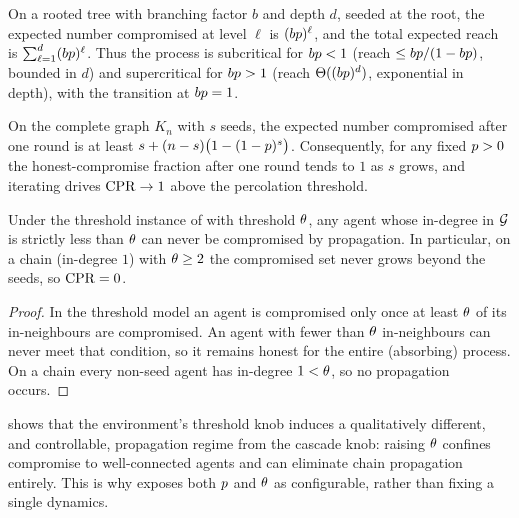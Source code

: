 \begin{proposition}
\label{prop:tree}
On a rooted tree with branching factor $b$ and depth $d$, seeded at the root, the expected
number compromised at level $\ell$ is $(bp)^{\ell}$, and the total expected reach is
$\sum_{\ell=1}^{d}(bp)^{\ell}$. Thus the process is subcritical for $bp<1$
(reach $\le bp/(1-bp)$, bounded in $d$) and supercritical for $bp>1$
(reach $\Theta((bp)^{d})$, exponential in depth), with the transition at $bp=1$.
\end{proposition}

\begin{proposition}
\label{prop:mesh}
On the complete graph $K_n$ with $s$ seeds, the expected number compromised after one
round is at least $s+(n-s)\bigl(1-(1-p)^{s}\bigr)$. Consequently, for any fixed
$p>0$ the honest-compromise fraction after one round tends to $1$ as $s$ grows, and
iterating drives $\mathrm{CPR}\to1$ above the percolation threshold.
\end{proposition}

\begin{corollary}
\label{cor:threshold}
Under the threshold instance of  with threshold $\theta$, any agent whose
in-degree in $\mathcal{G}$ is strictly less than $\theta$ can never be compromised by propagation.
In particular, on a chain (in-degree $1$) with $\theta\ge2$ the compromised set never grows
beyond the seeds, so $\mathrm{CPR}=0$.
\end{corollary}
\begin{proof}
In the threshold model an agent is compromised only once at least $\theta$ of its
in-neighbours are compromised. An agent with fewer than $\theta$ in-neighbours can never meet
that condition, so it remains honest for the entire (absorbing) process. On a chain every
non-seed agent has in-degree $1<\theta$, so no propagation occurs.
\end{proof}

\begin{remark}
 shows that the environment's threshold knob induces a qualitatively
different, and controllable, propagation regime from the cascade knob: raising $\theta$
confines compromise to well-connected agents and can eliminate chain propagation entirely.
This is why  exposes both $p$ and $\theta$ as configurable, rather than fixing a
single dynamics.
\end{remark}

